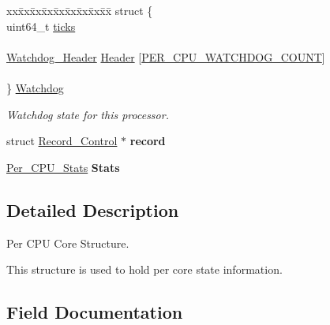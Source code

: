 \begin{DoxyCompactItemize}
\mbox{\label{structPer__CPU__Control_ae806d93446182a03cc73817a4d955373}} 
\begin{tabbing}
xx\=xx\=xx\=xx\=xx\=xx\=xx\=xx\=xx\=\kill
struct \{\\
\>uint64\_t \mbox{\hyperlink{structPer__CPU__Control_abafac09e8013b144149bf2b800797dc6}{ticks}}\\
\>\\
\>\mbox{\hyperlink{structWatchdog__Header}{Watchdog\_Header}} \mbox{\hyperlink{structPer__CPU__Control_a2d2163a1bbf81d706b0018f438a9c61f}{Header}} \mbox{[}\mbox{\hyperlink{group__PerCPU_gga43ab5440a69211901b58fa787f9cd76ea49ebdf20f41288627c23ddc6e63a20ab}{PER\_CPU\_WATCHDOG\_COUNT}}\mbox{]}\\
\>\\
\} \mbox{\hyperlink{structPer__CPU__Control_ae806d93446182a03cc73817a4d955373}{Watchdog}}\\

\end{tabbing}\begin{DoxyCompactList}\small\item\em Watchdog state for this processor. \end{DoxyCompactList}\item 
\mbox{\label{structPer__CPU__Control_a50c66678d52ff23c16487c686e6178cb}} 
struct \mbox{\hyperlink{structRecord__Control}{Record\+\_\+\+Control}} $\ast$ {\bfseries record}
\item 
\mbox{\label{structPer__CPU__Control_aea3dae83cb87a4dcf69c34fc93f2a02a}} 
\mbox{\hyperlink{structPer__CPU__Stats}{Per\+\_\+\+C\+P\+U\+\_\+\+Stats}} {\bfseries Stats}
\end{DoxyCompactItemize}


\subsection{Detailed Description}
Per C\+PU Core Structure. 

This structure is used to hold per core state information. 

\subsection{Field Documentation}
\mbox{\label{structPer__CPU__Control_a9fbfc99808e4e02178776e66334a4eb4}} 
